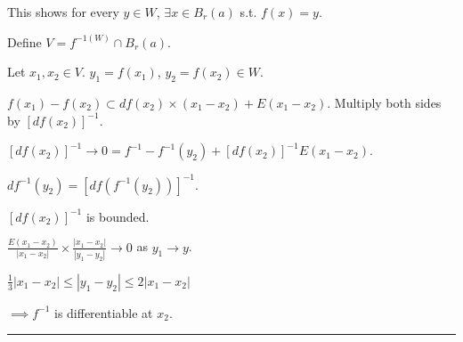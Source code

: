\documentclass[twoside]{article}
\newenvironment{proof}{{\bf Proof:}}{\hfill\rule{2mm}{2mm}}
\begin{document}
\begin{proof}
        This shows for every $y \in W$, $\exists x \in B_r(a)$ s.t. $f(x) = y$.

        Define $V = f^{-1(W)} \cap B_r(a)$. 

        Let $x_1, x_2 \in V$. $y_1 = f(x_1)$, $y_2 = f(x_2) \in W$. 

        $f(x_1) - f(x_2) \subset df(x_2)\times(x_1-x_2) + E(x_1 - x_2)$. Multiply both sides by $[df(x_2)]^{-1}$.

        $[df(x_2)]^{-1} \rightarrow 0 = f^{-1} - f^{-1}(y_2) + [df(x_2)]^{-1}E(x_1 - x_2)$. 

        $df^{-1}(y_2) = [df(f^{-1}(y_2))]^{-1}$. 

        $[df(x_2)]^{-1}$ is bounded. 

        $\frac{E(x_1 - x_2)}{|x_1 - x_2|} \times \frac{|x_1 - x_2|}{|y_1 - y_2|} \rightarrow 0$ as $y_1 \rightarrow y$. 

        $\frac13|x_1 - x_2| \leq |y_1 - y_2| \leq 2|x_1 - x_2|$

        $\implies f^{-1}$ is differentiable at $x_2$. 
    \end{proof}
\end{document}
